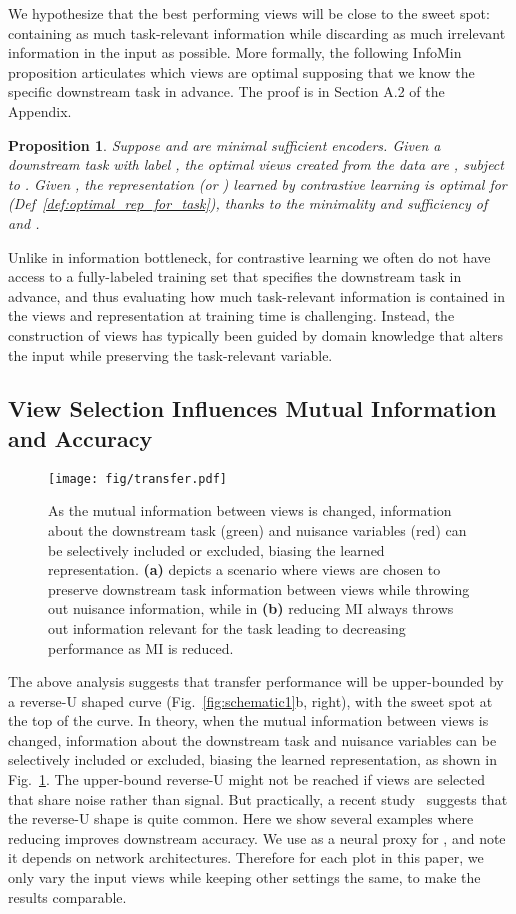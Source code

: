 \documentclass{article}
\newtheorem{prop}{Proposition}[section]
\begin{document}
We hypothesize that the best performing views will be close to the sweet spot: containing as much task-relevant information while discarding as much irrelevant information in the input as possible.  More formally, the following InfoMin proposition articulates which views are optimal supposing that we know the specific downstream task  in advance. The proof is in Section A.2 of the Appendix.
\begin{prop}\label{theory:infomin}
Suppose  and  are minimal sufficient encoders. Given a downstream task  with label , the optimal views created from the data  are , subject to . Given , the representation  (or ) learned by contrastive learning is optimal for  (Def~\ref{def:optimal_rep_for_task}), thanks to the minimality and sufficiency of  and .
\end{prop}
Unlike in information bottleneck, for contrastive learning we often do not have access to a fully-labeled training set that specifies the downstream task in advance, and thus evaluating how much task-relevant information is contained in the views and representation at training time is challenging. Instead, the construction of views has typically been guided by domain knowledge that alters the input while preserving the task-relevant variable.

\subsection{View Selection Influences Mutual Information and Accuracy}\label{sec:view_selection}

\begin{figure}[t]
\centering
\texttt{[image: fig/transfer.pdf]}
\vspace{-10pt}
\caption{\small As the mutual information between views is changed, information about the downstream task (green) and nuisance variables (red) can be selectively included or excluded, biasing the learned representation. {\bf (a)} depicts a scenario where views are chosen to preserve downstream task information between views while throwing out nuisance information, while in {\bf (b)} reducing MI always throws out information relevant for the task leading to decreasing performance as MI is reduced.}
\label{fig:view_transfer}
\end{figure}
 The above analysis suggests that transfer performance will be upper-bounded by a reverse-U shaped curve (Fig.~\ref{fig:schematic1}b, right), with the sweet spot at the top of the curve. In theory, when the mutual information between views is changed, information about the downstream task and nuisance variables can be selectively included or excluded, biasing the learned representation, as shown in Fig.~\ref{fig:view_transfer}. The upper-bound reverse-U might not be reached if views are selected that share noise rather than signal. But practically, a recent study~\cite{tian2019contrastive} suggests that the reverse-U shape is quite common. Here we show several examples where reducing  improves downstream accuracy. We use  as a neural proxy for , and note it depends on network architectures. Therefore for each plot in this paper, we only vary the input views while keeping other settings the same, to make the results comparable. 
\end{document}
